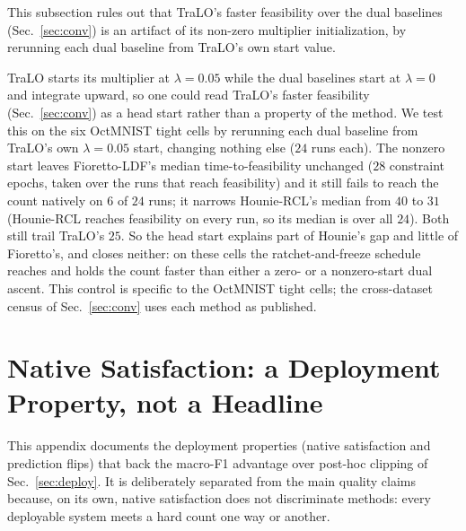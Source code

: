 \documentclass[10pt]{article}
\begin{document}
This subsection rules out that TraLO's faster feasibility over the dual
baselines (Sec.~\ref{sec:conv}) is an artifact of its non-zero multiplier
initialization, by rerunning each dual baseline from TraLO's own start
value.

TraLO starts its multiplier at $\lambda{=}0.05$ while the dual
baselines start at $\lambda{=}0$ and integrate upward, so one could
read TraLO's faster feasibility (Sec.~\ref{sec:conv}) as a head start
rather than a property of the method. We test this on the six OctMNIST
tight cells by rerunning each dual baseline from TraLO's own
$\lambda{=}0.05$ start, changing nothing else ($24$ runs each). The
nonzero start leaves Fioretto-LDF's median time-to-feasibility
unchanged ($28$ constraint epochs, taken over the runs that reach
feasibility) and it still fails to reach the count natively on $6$ of
$24$ runs; it narrows Hounie-RCL's median from $40$ to $31$
(Hounie-RCL reaches feasibility on every run, so its median is over
all $24$). Both still trail TraLO's $25$. So the head start explains
part of Hounie's gap and little of Fioretto's, and closes neither: on
these cells the ratchet-and-freeze schedule reaches and holds the
count faster than either a zero- or a nonzero-start dual ascent. This
control is specific to the OctMNIST tight cells; the cross-dataset
census of Sec.~\ref{sec:conv} uses each method as published.



\section{Native Satisfaction: a Deployment Property, not a Headline}
\label{app:deploy}

This appendix documents the deployment properties (native satisfaction
and prediction flips) that back the macro-F1 advantage over post-hoc
clipping of Sec.~\ref{sec:deploy}. It is deliberately separated from the
main quality claims because, on its own, native satisfaction does not
discriminate methods: every deployable system meets a hard count one
way or another.


\end{document}
